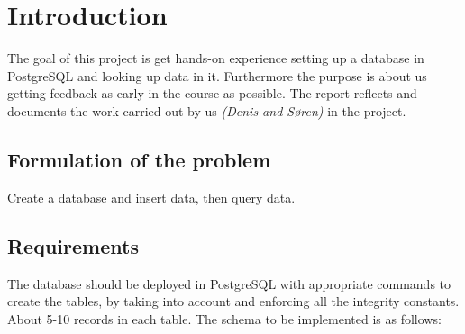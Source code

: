 \section{Introduction}
The goal of this project is get hands-on experience setting up a database in PostgreSQL and
looking up data in it. Furthermore the purpose is about us getting feedback as early in the course as possible. 
The report reflects and documents the work carried out by us \textit{(Denis and Søren)} in the project.

\subsection{Formulation of the problem}
Create a database and insert data, then query data.

\subsection{Requirements}
The database should be deployed in PostgreSQL with appropriate commands
to create the tables, by taking into account and enforcing all the integrity constants. About 5-10 records in each table.
\bigbreak
The schema to be implemented is as follows:\\

